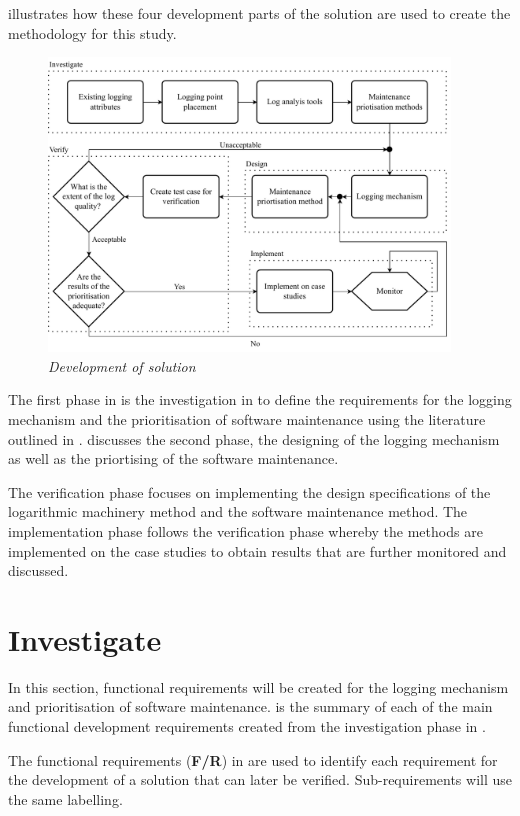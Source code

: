  illustrates how these four development parts of the solution are used to create the methodology for this study.

\begin{figure}[!htb]
	\centering %
	\includegraphics[width=0.95\textwidth]{img/Chapter2/developmentOfSolution/developementOfSolution.pdf}
	\caption[Development of solution]
	{\textit{Development of solution}}\label{fig:ch2_developmentOfSolution}
\end{figure}

The first phase in  is the investigation in  to define the requirements for the logging mechanism and the prioritisation of software maintenance using the literature outlined in .  discusses the second phase, the designing of the logging mechanism as well as the priortising of the software maintenance. 

\clearpage

The verification phase focuses on implementing the design specifications of the logarithmic machinery method and the software maintenance method. The implementation phase follows the verification phase whereby the methods are implemented on the case studies to obtain results that are further monitored and discussed.

\section{Investigate}\label{sec:ch2_investigate}
In this section, functional requirements will be created for the logging mechanism and prioritisation of software maintenance.  is the summary of each of the main functional development requirements created from the investigation phase in . \par The functional requirements (\textbf{F/R}) in  are used to identify each requirement for the development of a solution that can later be verified. Sub-requirements will use the same labelling. 

